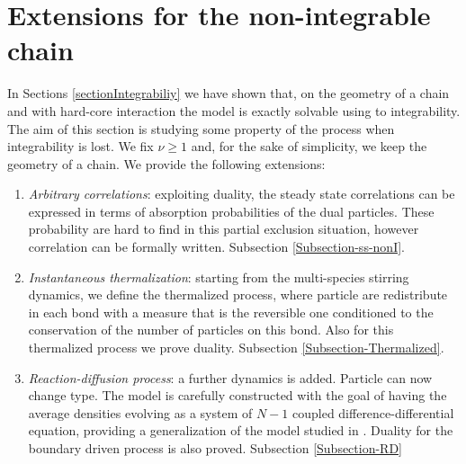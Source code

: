 \documentclass[10pt]{article}
\numberwithin{equation}{section}
\numberwithin{equation}{subsection}
\begin{document}
\section{Extensions for the non-integrable chain}
In Sections \ref{sectionIntegrabiliy} we have shown that, on the geometry of a chain and with hard-core interaction the model is exactly solvable using to integrability.  
The aim of this section is studying some property of the process when integrability is lost. We fix $\nu\geq 1$ and, for the sake of simplicity, we keep the geometry of a chain. We provide the following extensions: 
\begin{enumerate}
	\item \textit{Arbitrary correlations}: exploiting duality, the steady state correlations can be expressed in terms of absorption probabilities of the dual particles. These probability are hard to find in this partial exclusion situation, however correlation can be formally written. Subsection \ref{Subsection-ss-nonI}.
	\item \textit{Instantaneous thermalization}: starting from the multi-species stirring dynamics, we define the thermalized process, where particle are redistribute in each bond with a measure that is the reversible one conditioned to the conservation of the number of particles on this bond. Also for this thermalized process we prove duality. Subsection \ref{Subsection-Thermalized}.
	\item \textit{Reaction-diffusion process}: a further dynamics is added. Particle can now change type. The model is carefully constructed with the goal of having the average densities evolving as a system of $N-1$ coupled difference-differential equation, providing a generalization of the model studied in \cite{casini2022uphill}. Duality for the boundary driven process is also proved. Subsection \ref{Subsection-RD}
\end{enumerate}
\end{document}

